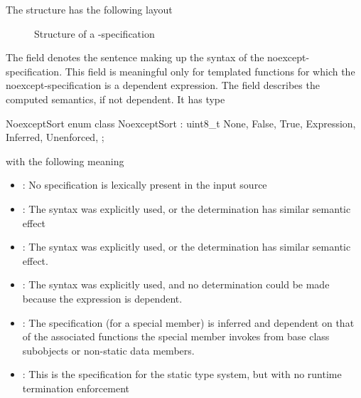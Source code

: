 

The structure  has the following layout
%
\begin{figure}[H]
	\centering
	\caption{Structure of a -specification}
	\label{fig:ifc-noexcept-specification-structure}
\end{figure}
%
The  field denotes the sentence making up the syntax of the noexcept-specification.
This field is meaningful only for templated functions for which the noexcept-specification is a dependent expression.
The  field describes the computed semantics, if not dependent.
It has type
\begin{typedef}{NoexceptSort}{}
	enum class NoexceptSort : uint8_t {
		None,
		False,
		True,
		Expression,
		Inferred,
		Unenforced,
	};
\end{typedef}
with the following meaning
\begin{itemize}
	\item {}:  No specification is lexically present in the input source
	\item {}: The syntax  was explicitly used, or the determination has similar semantic effect
	\item {}: The syntax  was explicitly used, or the determination has similar semantic effect.
	\item {}: The syntax  was explicitly used, and no determination could be made because the expression is dependent.
	\item {}: The  specification (for a special member) is inferred and dependent on that of the associated functions
		the special member invokes from base class subobjects or non-static data members. 
	\item {}: This is the specification for the static type system, but with no runtime termination enforcement
\end{itemize}

\subsection{}
\label{sec:ifc:DeclSort:InheritedConstructor}

